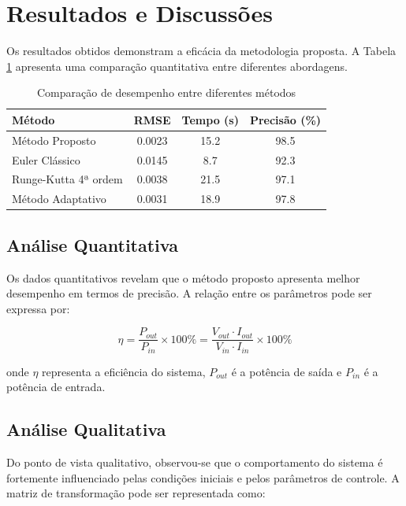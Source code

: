 \section{Resultados e Discussões}

\lipsum[12-13] Os resultados obtidos demonstram a eficácia da metodologia proposta. A Tabela \ref{tab:resultados} apresenta uma comparação quantitativa entre diferentes abordagens.

\begin{table}[H]
\centering
\caption{Comparação de desempenho entre diferentes métodos}
\label{tab:resultados}
\begin{tabular}{@{}lccc@{}}
\toprule
\textbf{Método} & \textbf{RMSE} & \textbf{Tempo (s)} & \textbf{Precisão (\%)} \\ \midrule
Método Proposto & 0.0023 & 15.2 & 98.5 \\
Euler Clássico & 0.0145 & 8.7 & 92.3 \\
Runge-Kutta 4ª ordem & 0.0038 & 21.5 & 97.1 \\
Método Adaptativo & 0.0031 & 18.9 & 97.8 \\
\bottomrule
\end{tabular}
\end{table}

\subsection{Análise Quantitativa}

\lipsum[14] Os dados quantitativos revelam que o método proposto apresenta melhor desempenho em termos de precisão. A relação entre os parâmetros pode ser expressa por:

\begin{equation}
\eta = \frac{P_{out}}{P_{in}} \times 100\% = \frac{V_{out} \cdot I_{out}}{V_{in} \cdot I_{in}} \times 100\%
\label{eq:efficiency}
\end{equation}

onde $\eta$ representa a eficiência do sistema, $P_{out}$ é a potência de saída e $P_{in}$ é a potência de entrada.

\subsection{Análise Qualitativa}

\lipsum[15] Do ponto de vista qualitativo, observou-se que o comportamento do sistema é fortemente influenciado pelas condições iniciais e pelos parâmetros de controle. A matriz de transformação pode ser representada como:


